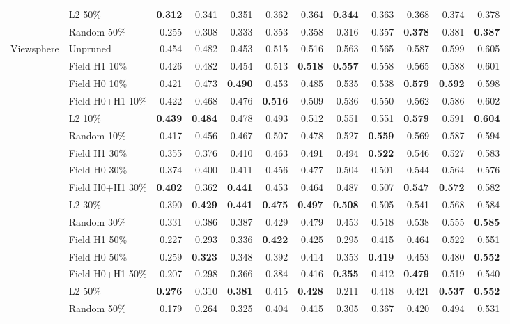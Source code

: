 \begin{tabular}{llrrrrrrrrrr}
 & L2 50\% & \textbf{0.312} & 0.341 & 0.351 & 0.362 & 0.364 & \textbf{0.344} & 0.363 & 0.368 & 0.374 & 0.378 \\
 & Random 50\% & 0.255 & 0.308 & 0.333 & 0.353 & 0.358 & 0.316 & 0.357 & \textbf{0.378} & 0.381 & \textbf{0.387} \\
\midrule
Viewsphere & Unpruned & 0.454 & 0.482 & 0.453 & 0.515 & 0.516 & 0.563 & 0.565 & 0.587 & 0.599 & 0.605 \\
 & Field H1 10\% & 0.426 & 0.482 & 0.454 & 0.513 & \textbf{0.518} & \textbf{0.557} & 0.558 & 0.565 & 0.588 & 0.601 \\
 & Field H0 10\% & 0.421 & 0.473 & \textbf{0.490} & 0.453 & 0.485 & 0.535 & 0.538 & \textbf{0.579} & \textbf{0.592} & 0.598 \\
 & Field H0+H1 10\% & 0.422 & 0.468 & 0.476 & \textbf{0.516} & 0.509 & 0.536 & 0.550 & 0.562 & 0.586 & 0.602 \\
 & L2 10\% & \textbf{0.439} & \textbf{0.484} & 0.478 & 0.493 & 0.512 & 0.551 & 0.551 & \textbf{0.579} & 0.591 & \textbf{0.604} \\
 & Random 10\% & 0.417 & 0.456 & 0.467 & 0.507 & 0.478 & 0.527 & \textbf{0.559} & 0.569 & 0.587 & 0.594 \\
\addlinespace[2pt]
 & Field H1 30\% & 0.355 & 0.376 & 0.410 & 0.463 & 0.491 & 0.494 & \textbf{0.522} & 0.546 & 0.527 & 0.583 \\
 & Field H0 30\% & 0.374 & 0.400 & 0.411 & 0.456 & 0.477 & 0.504 & 0.501 & 0.544 & 0.564 & 0.576 \\
 & Field H0+H1 30\% & \textbf{0.402} & 0.362 & \textbf{0.441} & 0.453 & 0.464 & 0.487 & 0.507 & \textbf{0.547} & \textbf{0.572} & 0.582 \\
 & L2 30\% & 0.390 & \textbf{0.429} & \textbf{0.441} & \textbf{0.475} & \textbf{0.497} & \textbf{0.508} & 0.505 & 0.541 & 0.568 & 0.584 \\
 & Random 30\% & 0.331 & 0.386 & 0.387 & 0.429 & 0.479 & 0.453 & 0.518 & 0.538 & 0.555 & \textbf{0.585} \\
\addlinespace[2pt]
 & Field H1 50\% & 0.227 & 0.293 & 0.336 & \textbf{0.422} & 0.425 & 0.295 & 0.415 & 0.464 & 0.522 & 0.551 \\
 & Field H0 50\% & 0.259 & \textbf{0.323} & 0.348 & 0.392 & 0.414 & 0.353 & \textbf{0.419} & 0.453 & 0.480 & \textbf{0.552} \\
 & Field H0+H1 50\% & 0.207 & 0.298 & 0.366 & 0.384 & 0.416 & \textbf{0.355} & 0.412 & \textbf{0.479} & 0.519 & 0.540 \\
 & L2 50\% & \textbf{0.276} & 0.310 & \textbf{0.381} & 0.415 & \textbf{0.428} & 0.211 & 0.418 & 0.421 & \textbf{0.537} & \textbf{0.552} \\
 & Random 50\% & 0.179 & 0.264 & 0.325 & 0.404 & 0.415 & 0.305 & 0.367 & 0.420 & 0.494 & 0.531 \\
\bottomrule
\end{tabular}
